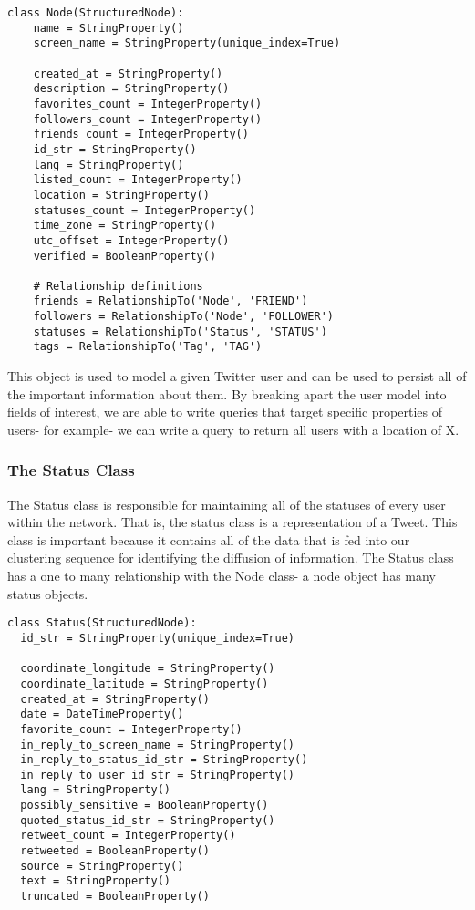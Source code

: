 \begin{lstlisting}
class Node(StructuredNode):
    name = StringProperty()
    screen_name = StringProperty(unique_index=True)
    
    created_at = StringProperty()
    description = StringProperty()
    favorites_count = IntegerProperty()
    followers_count = IntegerProperty()
    friends_count = IntegerProperty()
    id_str = StringProperty()
    lang = StringProperty()
    listed_count = IntegerProperty()
    location = StringProperty()
    statuses_count = IntegerProperty()
    time_zone = StringProperty()
    utc_offset = IntegerProperty()
    verified = BooleanProperty()
    
    # Relationship definitions
    friends = RelationshipTo('Node', 'FRIEND')
    followers = RelationshipTo('Node', 'FOLLOWER')
    statuses = RelationshipTo('Status', 'STATUS')
    tags = RelationshipTo('Tag', 'TAG')
\end{lstlisting}

This object is used to model a given Twitter user and can be used to
persist all of the important information about them. By breaking apart
the user model into fields of interest, we are able to write queries
that target specific properties of users- for example- we can write a
query to return all users with a location of X.

\subsubsection{The  Status Class}
The Status class is responsible for maintaining all of the statuses of
every user within the network. That is, the status class is a
representation of a Tweet. This class is important because it contains
all of the data that is fed into our clustering sequence for
identifying the diffusion of information. The Status class has a one
to many relationship with the Node class- a node object has
many status objects.

\begin{lstlisting}
class Status(StructuredNode):
  id_str = StringProperty(unique_index=True)

  coordinate_longitude = StringProperty()
  coordinate_latitude = StringProperty()
  created_at = StringProperty()
  date = DateTimeProperty()
  favorite_count = IntegerProperty()
  in_reply_to_screen_name = StringProperty()
  in_reply_to_status_id_str = StringProperty()
  in_reply_to_user_id_str = StringProperty()
  lang = StringProperty()
  possibly_sensitive = BooleanProperty()
  quoted_status_id_str = StringProperty()
  retweet_count = IntegerProperty()
  retweeted = BooleanProperty()
  source = StringProperty()
  text = StringProperty()
  truncated = BooleanProperty()
\end{lstlisting}

